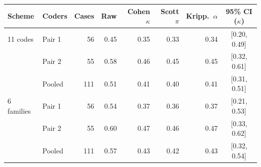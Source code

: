\begin{tabular}{@{}llrrrrrc@{}}
\toprule
Scheme & Coders & Cases & Raw & Cohen $\kappa$ & Scott $\pi$ & Kripp.\ $\alpha$ & 95\% CI ($\kappa$) \\
\midrule
11 codes & Pair 1 & 56 & 0.45 & 0.35 & 0.33 & 0.34 & [0.20, 0.49] \\
 & Pair 2 & 55 & 0.58 & 0.46 & 0.45 & 0.45 & [0.32, 0.61] \\
 & Pooled & 111 & 0.51 & 0.41 & 0.40 & 0.41 & [0.31, 0.51] \\
\midrule
6 families & Pair 1 & 56 & 0.54 & 0.37 & 0.36 & 0.37 & [0.21, 0.53] \\
 & Pair 2 & 55 & 0.60 & 0.47 & 0.46 & 0.47 & [0.33, 0.62] \\
 & Pooled & 111 & 0.57 & 0.43 & 0.42 & 0.43 & [0.32, 0.54] \\
\bottomrule
\end{tabular}
